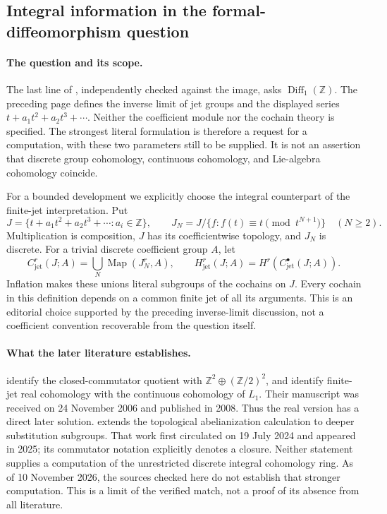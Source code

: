 \subsection{Integral information in the formal-diffeomorphism question}
\label{dev:1977-jets}

\paragraph{The question and its scope.}
The last line of , independently checked against the image, asks
 \(\operatorname{Diff}_1(\mathbb Z)\).
The preceding page defines the inverse limit of jet groups and the displayed
series \(t+a_1t^2+a_2t^3+\cdots\). Neither the coefficient module nor the
cochain theory is specified. The strongest literal formulation is therefore a
request for a computation, with these two parameters still to be supplied.
It is not an assertion that discrete group cohomology, continuous cohomology,
and Lie-algebra cohomology coincide.

For a bounded development we explicitly choose the integral counterpart of
the finite-jet interpretation. Put
\[
 J=\{t+a_1t^2+a_2t^3+\cdots:a_i\in\mathbb Z\},\qquad
 J_N=J/\{f:f(t)\equiv t\pmod {t^{N+1}}\}\quad(N\geq2).
\]
Multiplication is composition, \(J\) has its coefficientwise topology, and
\(J_N\) is discrete. For a trivial discrete coefficient group \(A\), let
\[
 C^r_{\mathrm{jet}}(J;A)
   =\bigcup_N\operatorname{Map}(J_N^r,A),\qquad
 H^r_{\mathrm{jet}}(J;A)=H^r(C^\bullet_{\mathrm{jet}}(J;A)).
\]
Inflation makes these unions literal subgroups of the cochains on \(J\).
Every cochain in this definition depends on a common finite jet of all its
arguments. This is an editorial choice supported by the preceding inverse-limit
discussion, not a coefficient convention recoverable from the question itself.

\paragraph{What the later literature establishes.}
\citet[Theorems~1.2 and~1.5; Proposition~4.4]{babenkobogatyi2008substitutions}
identify the closed-commutator quotient with
\(\mathbb Z^2\oplus(\mathbb Z/2)^2\), and identify finite-jet real cohomology
with the continuous cohomology of \(L_1\). Their manuscript was received on
24 November 2006 and published in 2008. Thus the real version has a direct
later solution. \citet[Introduction and Theorem~1.0.2 of the preprint]{pavezcornejo2025abelianization}
extends the topological abelianization calculation to deeper substitution
subgroups. That work first circulated on 19 July 2024 and appeared in 2025;
its commutator notation explicitly denotes a closure. Neither statement
supplies a computation of the unrestricted discrete integral cohomology ring.
As of 10 November 2026, the sources checked here do not establish that stronger
computation. This is a limit of the verified match, not a proof of its absence
from all literature.

